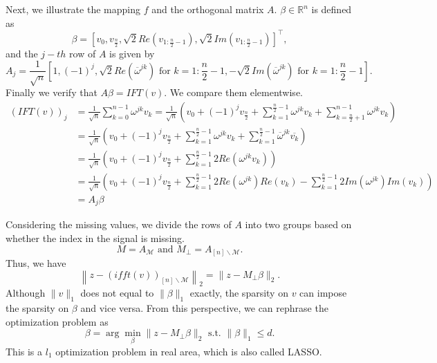\documentclass[final,onefignum,onetabnum]{siamart190516}
\begin{document}
Next, we illustrate the mapping $f$ and the orthogonal matrix $A$. $\beta\in\mathbb{R}^n$ is defined as
\begin{equation}\label{beta}
    \beta = [v_0, v_{\frac{n}{2}}, \sqrt{2}Re(v_{1:\frac{n}{2}-1}),  \sqrt{2}Im(v_{1:\frac{n}{2}-1})]^\top,
\end{equation}
and the $j-th$ row of $A$ is given by
\begin{equation}\label{A}
    A_j = \frac{1}{\sqrt{n}}[1, (-1)^j, \sqrt{2}Re\left(\overline{\omega}^{jk}\right) \text{ for }k = 1:\frac{n}{2}-1, -\sqrt{2}Im\left(\overline{\omega}^{jk}\right) \text{ for }k = 1:\frac{n}{2}-1].
\end{equation}
Finally we verify that $A\beta = IFT(v)$. We compare them elementwise.
\begin{equation}
\begin{aligned}
    \left(IFT(v)\right)_j &= \frac{1}{\sqrt{n}}\sum_{k=0}^{n-1}\omega^{jk}v_k =\frac{1}{\sqrt{n}}\left(v_0 + (-1)^j v_{\frac{n}{2}} +\sum_{k=1}^{\frac{n}{2}-1}\omega^{jk}v_k + \sum_{k=\frac{n}{2}+1}^{n-1}\omega^{jk}v_k\right)\\
    & = \frac{1}{\sqrt{n}}\left(v_0 + (-1)^j v_{\frac{n}{2}} +\sum_{k=1}^{\frac{n}{2}-1}\omega^{jk}v_k + \sum_{k=1}^{\frac{n}{2}-1}\overline{\omega}^{jk}\overline{v_k}\right)\\
    &= \frac{1}{\sqrt{n}}\left(v_0 + (-1)^j v_{\frac{n}{2}} +\sum_{k=1}^{\frac{n}{2}-1}2Re(\omega^{jk}v_k)\right)\\
    &=\frac{1}{\sqrt{n}}\left(v_0 + (-1)^j v_{\frac{n}{2}} +\sum_{k=1}^{\frac{n}{2}-1}2Re(\omega^{jk})Re(v_k) -\sum_{k=1}^{\frac{n}{2}-1} 2Im(\omega^{jk})Im(v_k)\right)\\
    &=A_j\beta
\end{aligned}
\end{equation}


Considering the missing values, we divide the rows of $A$ into two groups based on whether the index in the signal is missing. 
\begin{equation}
    M = A_{\mathcal{M}}\text{ and }M_{\perp} = A_{[n]\backslash\mathcal{M}}.
\end{equation}
Thus, we have
\begin{equation}
    \left\|z - \left(ifft(v)\right)_{[n]\backslash\mathcal{M}}\right\|_2 = \|z-M_{\perp}\beta\|_2.
\end{equation}
Although $\|v\|_1$ does not equal to $\|\beta\|_1$ exactly, the sparsity on $v$ can impose the sparsity on $\beta$ and vice versa. From this perspective, we can rephrase the optimization problem as
\begin{equation}\label{realopt}
    \beta = \arg\min_{\beta}\|z-M_{\perp}\beta\|_2\text{ s.t. }\|\beta\|_1\leq d.
\end{equation}
This is a $l_1$ optimization problem in real area, which is also called LASSO. 
\end{document}
